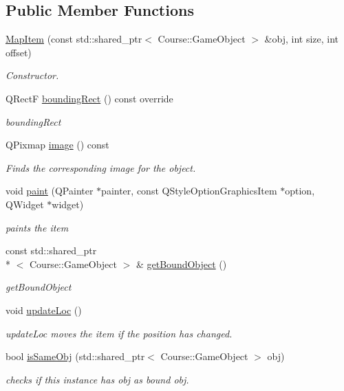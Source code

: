 \subsection*{Public Member Functions}
\begin{DoxyCompactItemize}
\item 
\hyperlink{classMapItem_abd291e247593a597f6e42bb135064c53}{Map\-Item} (const std\-::shared\-\_\-ptr$<$ Course\-::\-Game\-Object $>$ \&obj, int size, int offset)
\begin{DoxyCompactList}\small\item\em Constructor. \end{DoxyCompactList}\item 
Q\-Rect\-F \hyperlink{classMapItem_a3b3b3273632471f2513035a200340a69}{bounding\-Rect} () const override
\begin{DoxyCompactList}\small\item\em bounding\-Rect \end{DoxyCompactList}\item 
Q\-Pixmap \hyperlink{classMapItem_a29b49ba0fcb6aa491cfcfbe2369295ac}{image} () const 
\begin{DoxyCompactList}\small\item\em Finds the corresponding image for the object. \end{DoxyCompactList}\item 
void \hyperlink{classMapItem_acc9ed7dd172a0f757216d3f00a30c60c}{paint} (Q\-Painter $\ast$painter, const Q\-Style\-Option\-Graphics\-Item $\ast$option, Q\-Widget $\ast$widget)
\begin{DoxyCompactList}\small\item\em paints the item \end{DoxyCompactList}\item 
const std\-::shared\-\_\-ptr\\*
$<$ Course\-::\-Game\-Object $>$ \& \hyperlink{classMapItem_a63ef014ada46c6b68de1fbe87a43c435}{get\-Bound\-Object} ()
\begin{DoxyCompactList}\small\item\em get\-Bound\-Object \end{DoxyCompactList}\item 
\hypertarget{classMapItem_aa2c3ad1e8c9023042ce71dfda1e9c0ed}{void \hyperlink{classMapItem_aa2c3ad1e8c9023042ce71dfda1e9c0ed}{update\-Loc} ()}\label{classMapItem_aa2c3ad1e8c9023042ce71dfda1e9c0ed}

\begin{DoxyCompactList}\small\item\em update\-Loc moves the item if the position has changed. \end{DoxyCompactList}\item 
bool \hyperlink{classMapItem_add416649188fbdddfafcb76164e93ce5}{is\-Same\-Obj} (std\-::shared\-\_\-ptr$<$ Course\-::\-Game\-Object $>$ obj)
\begin{DoxyCompactList}\small\item\em checks if this instance has obj as bound obj. \end{DoxyCompactList}\end{DoxyCompactItemize}


